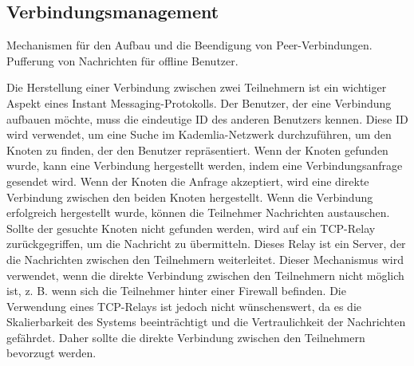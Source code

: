 \subsection{Verbindungsmanagement}

Mechanismen für den Aufbau und die Beendigung von Peer-Verbindungen.
Pufferung von Nachrichten für offline Benutzer.

Die Herstellung einer Verbindung zwischen zwei Teilnehmern ist ein wichtiger
Aspekt eines Instant Messaging-Protokolls. Der Benutzer, der eine Verbindung
aufbauen möchte, muss die eindeutige ID des anderen Benutzers kennen. Diese
ID wird verwendet, um eine Suche im Kademlia-Netzwerk durchzuführen, um den
Knoten zu finden, der den Benutzer repräsentiert. Wenn der Knoten gefunden
wurde, kann eine Verbindung hergestellt werden, indem eine Verbindungsanfrage
gesendet wird. Wenn der Knoten die Anfrage akzeptiert, wird eine direkte Verbindung
zwischen den beiden Knoten hergestellt. Wenn die Verbindung erfolgreich hergestellt
wurde, können die Teilnehmer Nachrichten austauschen. Sollte der gesuchte Knoten
nicht gefunden werden, wird auf ein TCP-Relay zurückgegriffen, um die Nachricht
zu übermitteln. Dieses Relay ist ein Server, der die Nachrichten zwischen den
Teilnehmern weiterleitet. Dieser Mechanismus wird verwendet, wenn die direkte
Verbindung zwischen den Teilnehmern nicht möglich ist, z. B. wenn sich die Teilnehmer
hinter einer Firewall befinden. Die Verwendung eines TCP-Relays ist jedoch nicht
wünschenswert, da es die Skalierbarkeit des Systems beeinträchtigt und die
Vertraulichkeit der Nachrichten gefährdet. Daher sollte die direkte Verbindung
zwischen den Teilnehmern bevorzugt werden.
